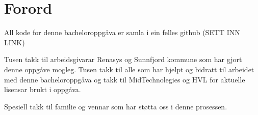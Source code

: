 \chapter*{Forord}
\thispagestyle{fancy}
All kode for denne bacheloroppgåva er samla i ein felles github (SETT INN LINK)

Tusen takk til arbeidsgivarar Renasys og Sunnfjord kommune som har gjort denne oppgåve mogleg.
Tusen takk til alle som har hjelpt og bidratt til arbeidet med denne bacheloroppgåva og
takk til MidTechnolegies og HVL for aktuelle lisensar brukt i oppgåva.

Spesiell takk til familie og vennar som har støtta oss i denne prosessen.

\thispagestyle{empty}